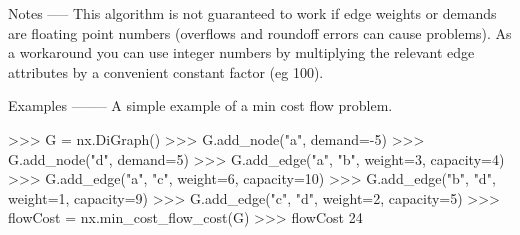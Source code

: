 \begin{DoxyVerb}
Notes
-----
This algorithm is not guaranteed to work if edge weights or demands
are floating point numbers (overflows and roundoff errors can
cause problems). As a workaround you can use integer numbers by
multiplying the relevant edge attributes by a convenient
constant factor (eg 100).

Examples
--------
A simple example of a min cost flow problem.

>>> G = nx.DiGraph()
>>> G.add_node("a", demand=-5)
>>> G.add_node("d", demand=5)
>>> G.add_edge("a", "b", weight=3, capacity=4)
>>> G.add_edge("a", "c", weight=6, capacity=10)
>>> G.add_edge("b", "d", weight=1, capacity=9)
>>> G.add_edge("c", "d", weight=2, capacity=5)
>>> flowCost = nx.min_cost_flow_cost(G)
>>> flowCost
24
\end{DoxyVerb}
 